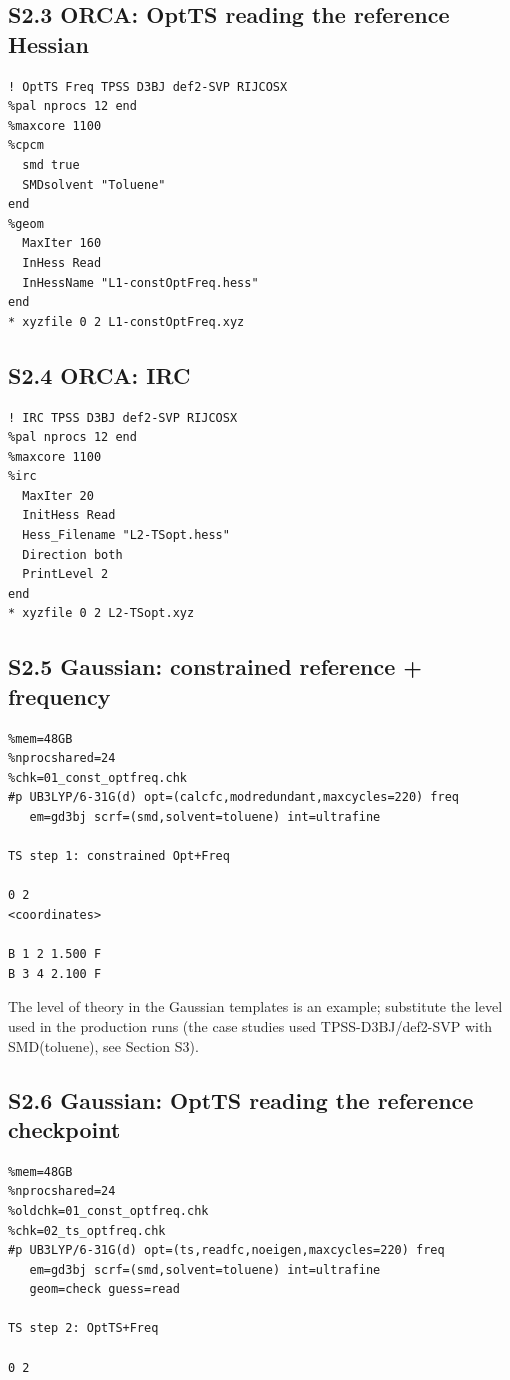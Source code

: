 \documentclass[11pt,a4paper]{article}
\begin{document}
\subsection*{S2.3 ORCA: OptTS reading the reference Hessian}
\begin{verbatim}
! OptTS Freq TPSS D3BJ def2-SVP RIJCOSX
%pal nprocs 12 end
%maxcore 1100
%cpcm
  smd true
  SMDsolvent "Toluene"
end
%geom
  MaxIter 160
  InHess Read
  InHessName "L1-constOptFreq.hess"
end
* xyzfile 0 2 L1-constOptFreq.xyz
\end{verbatim}

\subsection*{S2.4 ORCA: IRC}
\begin{verbatim}
! IRC TPSS D3BJ def2-SVP RIJCOSX
%pal nprocs 12 end
%maxcore 1100
%irc
  MaxIter 20
  InitHess Read
  Hess_Filename "L2-TSopt.hess"
  Direction both
  PrintLevel 2
end
* xyzfile 0 2 L2-TSopt.xyz
\end{verbatim}

\subsection*{S2.5 Gaussian: constrained reference + frequency}
\begin{verbatim}
%mem=48GB
%nprocshared=24
%chk=01_const_optfreq.chk
#p UB3LYP/6-31G(d) opt=(calcfc,modredundant,maxcycles=220) freq
   em=gd3bj scrf=(smd,solvent=toluene) int=ultrafine

TS step 1: constrained Opt+Freq

0 2
<coordinates>

B 1 2 1.500 F
B 3 4 2.100 F

\end{verbatim}

The level of theory in the Gaussian templates is an example; substitute the level used in the production runs (the case studies used TPSS-D3BJ/def2-SVP with SMD(toluene), see Section S3).

\subsection*{S2.6 Gaussian: OptTS reading the reference checkpoint}
\begin{verbatim}
%mem=48GB
%nprocshared=24
%oldchk=01_const_optfreq.chk
%chk=02_ts_optfreq.chk
#p UB3LYP/6-31G(d) opt=(ts,readfc,noeigen,maxcycles=220) freq
   em=gd3bj scrf=(smd,solvent=toluene) int=ultrafine
   geom=check guess=read

TS step 2: OptTS+Freq

0 2

\end{verbatim}
\end{document}
